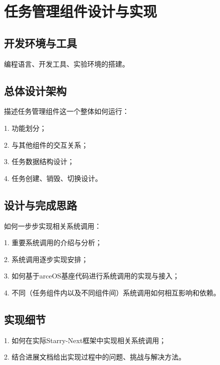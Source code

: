 
\chapter{任务管理组件设计与实现}

\section{开发环境与工具}

编程语言、开发工具、实验环境的搭建。



\section{总体设计架构}

描述任务管理组件这一个整体如何运行：

1. 功能划分；

2. 与其他组件的交互关系；

3. 任务数据结构设计；

4. 任务创建、销毁、切换设计。



\section{设计与完成思路}

如何一步步实现相关系统调用：

1. 重要系统调用的介绍与分析；

2. 系统调用逐步实现安排；

3. 如何基于arceOS基座代码进行系统调用的实现与接入；

4. 不同（任务组件内以及不同组件间）系统调用如何相互影响和依赖。



\section{实现细节}

1. 如何在实际Starry-Next框架中实现相关系统调用；

2. 结合进展文档给出实现过程中的问题、挑战与解决方法。

